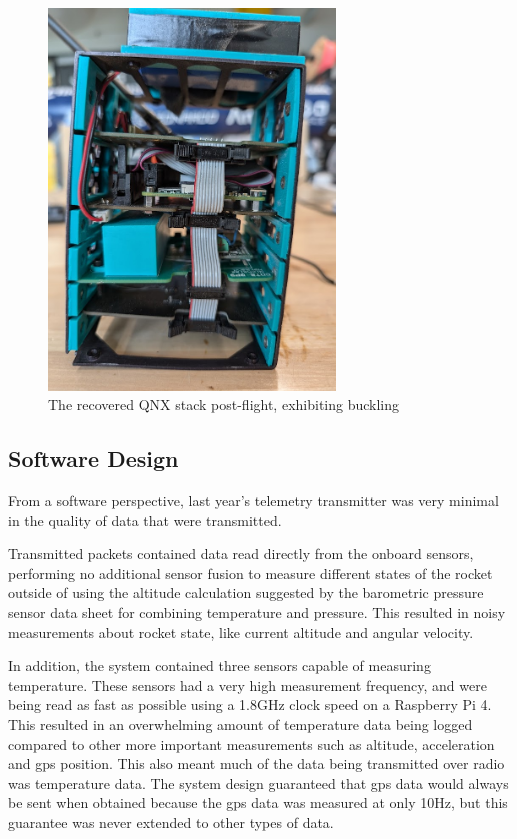 \begin{figure}[H]
    \center
    \includegraphics[width=3in]{assets/images/bent-stack.jpg}
    \caption{The recovered QNX stack post-flight, exhibiting buckling}
    \label{fig:stack-bent}
\end{figure}

\subsection{Software Design}

From a software perspective, last year's telemetry transmitter was very minimal in the quality of data that were
transmitted.

Transmitted packets contained data read directly from the onboard sensors, performing no additional sensor fusion to
measure different states of the rocket outside of using the altitude calculation suggested by the barometric pressure
sensor data sheet for combining temperature and pressure. This resulted in noisy measurements about rocket state, like
current altitude and angular velocity.

In addition, the system contained three sensors capable of measuring temperature. These sensors had a very high
measurement frequency, and were being read as fast as possible using a 1.8GHz clock speed on a Raspberry Pi 4. This
resulted in an overwhelming amount of temperature data being logged compared to other more important measurements such
as altitude, acceleration and \gls{gps} position. This also meant much of the data being transmitted over radio was
temperature data. The system design guaranteed that \gls{gps} data would always be sent when obtained because the
\gls{gps} data was measured at only 10Hz, but this guarantee was never extended to other types of data.

